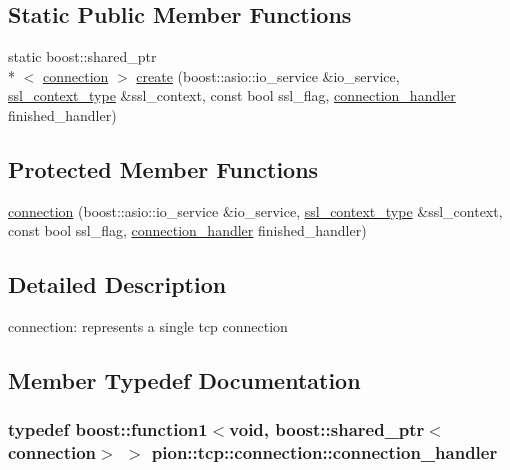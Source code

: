 \subsection*{Static Public Member Functions}
\begin{DoxyCompactItemize}
\item 
static boost\-::shared\-\_\-ptr\\*
$<$ \hyperlink{classpion_1_1tcp_1_1connection}{connection} $>$ \hyperlink{classpion_1_1tcp_1_1connection_a5e9118f2f2f31b834f04d22a058fd1eb}{create} (boost\-::asio\-::io\-\_\-service \&io\-\_\-service, \hyperlink{classpion_1_1tcp_1_1connection_a8587c35bbf48a119aa82f228e779a30e}{ssl\-\_\-context\-\_\-type} \&ssl\-\_\-context, const bool ssl\-\_\-flag, \hyperlink{classpion_1_1tcp_1_1connection_aa2b220bff63f258b6aeba7eaf9a39aed}{connection\-\_\-handler} finished\-\_\-handler)
\end{DoxyCompactItemize}
\subsection*{Protected Member Functions}
\begin{DoxyCompactItemize}
\item 
\hyperlink{classpion_1_1tcp_1_1connection_a7e1f15340d3c9e593fdd15764c50dd15}{connection} (boost\-::asio\-::io\-\_\-service \&io\-\_\-service, \hyperlink{classpion_1_1tcp_1_1connection_a8587c35bbf48a119aa82f228e779a30e}{ssl\-\_\-context\-\_\-type} \&ssl\-\_\-context, const bool ssl\-\_\-flag, \hyperlink{classpion_1_1tcp_1_1connection_aa2b220bff63f258b6aeba7eaf9a39aed}{connection\-\_\-handler} finished\-\_\-handler)
\end{DoxyCompactItemize}


\subsection{Detailed Description}
connection\-: represents a single tcp connection 

\subsection{Member Typedef Documentation}
\hypertarget{classpion_1_1tcp_1_1connection_aa2b220bff63f258b6aeba7eaf9a39aed}{
\subsubsection[{connection\-\_\-handler}]{\setlength{\rightskip}{0pt plus 5cm}typedef boost\-::function1$<$void, boost\-::shared\-\_\-ptr$<${\bf connection}$>$ $>$ {\bf pion\-::tcp\-::connection\-::connection\-\_\-handler}}}\label{classpion_1_1tcp_1_1connection_aa2b220bff63f258b6aeba7eaf9a39aed}


